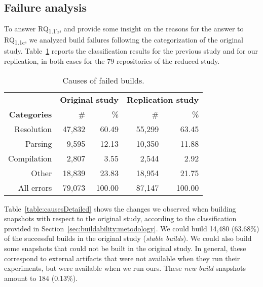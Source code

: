 \subsection{Failure analysis}

To answer RQ\textsubscript{1.1b}, and provide some insight on the reasons for the answer to RQ\textsubscript{1.1c}, we analyzed build failures following the categorization of the original study. Table~\ref{table:allCauses} reports the classification results for the previous study and for our replication, in both cases for the 79 repositories of the reduced study.

\begin{table}[ht!]
\caption{Causes of failed builds.}
\label{table:allCauses}
\begin{center}
\begin{tabular*}{\textwidth}{@{\extracolsep{\fill}}rrrrr}
\toprule
\multicolumn{1}{l}{}	    & \multicolumn{2}{c}{\bf{Original study}}    & \multicolumn{2}{c}{\bf{Replication study}}  \\
\bf{Categories}                 & \multicolumn{1}{r}{\#} & \multicolumn{1}{r}{\%} & \multicolumn{1}{r}{\#} & \multicolumn{1}{r}{\%}  \\
\midrule
Resolution  & 47,832 &  60.49 & 55,299 & 63.45  \\
Parsing     &  9,595 &  12.13 & 10,350 & 11.88  \\
Compilation &  2,807 &   3.55 &  2,544 &  2.92  \\
Other       & 18,839 &  23.83 & 18,954 & 21.75  \\
\midrule
All errors & 79,073 & 100.00 & 87,147 & 100.00 \\
\bottomrule
\end{tabular*}
\end{center}
\end{table}

Table~\ref{table:causesDetailed} shows the changes we observed when building snapshots with respect to the original study, according to the classification provided in Section~\ref{sec:buildability:metodology}. We could build 14,480 (63.68\%) of the successful builds in the original study (\textit{stable builds}). We could also build some snapshots that could not be built in the original study. In general, these correspond to external artifacts that were not available when they run their experiments, but were available when we run ours. These \emph{new build} snapshots amount to 184 (0.13\%).


